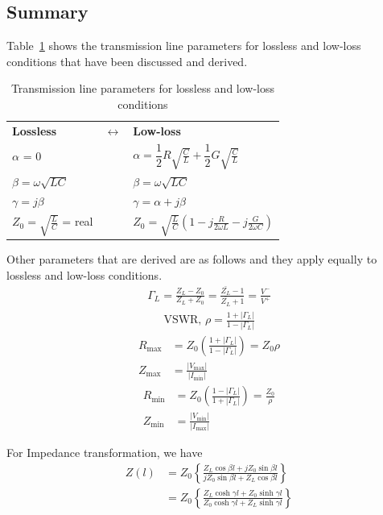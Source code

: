 \subsection*{Summary}
Table~\ref{tab:transparams} shows the transmission line parameters for lossless and low-loss conditions that have been discussed and derived.
\begin{table}[h]
\caption[short]{Transmission line parameters for lossless and low-loss conditions}
\label{tab:transparams}
\begin{tabular}{l c l}
{\bf Lossless}&  	$\leftrightarrow$ & {\bf Low-loss} \\ 
$\alpha$ = 0 & & $\alpha = \dfrac{1}{2}R\sqrt{\frac{C}{L}} + \dfrac{1}{2}G\sqrt{\frac{C}{L}}$\\
$\beta = \omega\sqrt{LC}$ & & $\beta = \omega\sqrt{LC}$\\
$\gamma = j\beta$ & & $\gamma = \alpha + j\beta$\\
$Z_0 = \sqrt{\frac{L}{C}}$ = real & & 	$Z_0 = \sqrt{\frac{L}{C}}\left(1 - j\frac{R}{2\omega L} - j\frac{G}{2\omega C}\right)$
\end{tabular} 
\end{table} 

Other parameters that are derived are as follows and they apply equally to lossless and low-loss conditions.
\begin{align*}
\Gamma_L = \frac{Z_L - Z_0}{Z_L + Z_0} = \frac{\bar{Z_L} - 1}{\bar{Z_L} + 1} = \frac{V^-}{V^+}
\end{align*}
\begin{align*}
\text{VSWR, }\rho = \frac{1 + |\Gamma_L|}{1 - |\Gamma_L|}
\end{align*}
\begin{align*}
R_\max &= Z_0 \left( \frac{1 + |\Gamma_L|}{1 - |\Gamma_L|}\right) = Z_0 \rho\\
Z_\max &= \frac{|V_\max|}{|I_\min|}
\end{align*}
\begin{align*}
R_\min &= Z_0 \left(\frac{1 - |\Gamma_L|}{1 + |\Gamma_L|}\right) = \frac{Z_0}{\rho}\\
Z_\min &= \frac{|V_\min|}{|I_\max|}
\end{align*}

For Impedance transformation, we have
\begin{align*}
Z(l) &= Z_0\left\lbrace\frac{Z_L\cos\beta l + jZ_0\sin\beta l}{jZ_0\sin\beta l + Z_L\cos\beta l}\right\rbrace\\ 
&= Z_0\left\lbrace\frac{Z_L\cosh\gamma l + Z_0\sinh\gamma l}{Z_0\cosh\gamma l + Z_L\sinh\gamma l}\right\rbrace
\end{align*}

